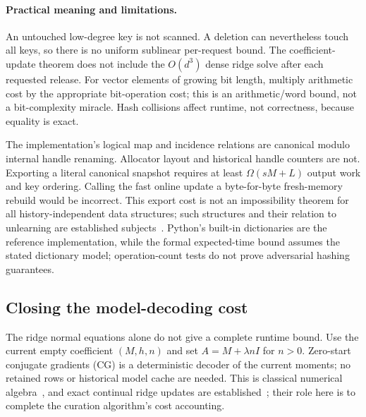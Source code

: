 \documentclass[11pt,a4paper]{article}
\theoremstyle{definition}\newtheorem{definition}[theorem]{Definition}
\begin{document}
\paragraph{Practical meaning and limitations.} An untouched low-degree key is not scanned. A deletion can nevertheless touch all keys, so there is no uniform sublinear per-request bound. The coefficient-update theorem does not include the $O(d^3)$ dense ridge solve after each requested release. For vector elements of growing bit length, multiply arithmetic cost by the appropriate bit-operation cost; this is an arithmetic/word bound, not a bit-complexity miracle. Hash collisions affect runtime, not correctness, because equality is exact.

The implementation's logical map and incidence relations are canonical modulo internal handle renaming. Allocator layout and historical handle counters are not. Exporting a literal canonical snapshot requires at least $\Omega(sM+L)$ output work and key ordering. Calling the fast online update a byte-for-byte fresh-memory rebuild would be incorrect. This export cost is not an impossibility theorem for all history-independent data structures; such structures and their relation to unlearning are established subjects~\cite{cohen2023}. Python's built-in dictionaries are the reference implementation, while the formal expected-time bound assumes the stated dictionary model; operation-count tests do not prove adversarial hashing guarantees.

\subsection{Closing the model-decoding cost}\label{sec:ridge-decode}
The ridge normal equations alone do not give a complete runtime bound. Use the current empty coefficient $(M,h,n)$ and set $A=M+\lambda nI$ for $n>0$. Zero-start conjugate gradients (CG) is a deterministic decoder of the current moments; no retained rows or historical model cache are needed. This is classical numerical algebra~\cite{hestenes1952}, and exact continual ridge updates are established~\cite{quan2026}; their role here is to complete the curation algorithm's cost accounting.
\end{document}
